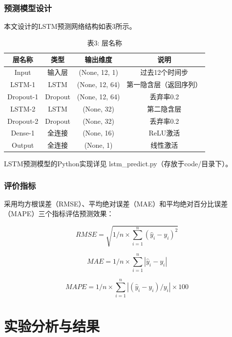 \subsubsection{预测模型设计}

本文设计的LSTM预测网络结构如表3所示。

\begin{table}[H]
  \centering
  \caption{表3: 层名称}
  \label{tab:3}
  \begin{tabular}{cccc}
    \toprule
    层名称 & 类型 & 输出维度 & 说明 \\
    \midrule
    Input & 输入层 & (None, 12, 1) & 过去12个时间步 \\
    LSTM-1 & LSTM & (None, 12, 64) & 第一隐含层（返回序列） \\
    Dropout-1 & Dropout & (None, 12, 64) & 丢弃率0.2 \\
    LSTM-2 & LSTM & (None, 32) & 第二隐含层 \\
    Dropout-2 & Dropout & (None, 32) & 丢弃率0.2 \\
    Dense-1 & 全连接 & (None, 16) & ReLU激活 \\
    Output & 全连接 & (None, 1) & 线性激活 \\
    \bottomrule
  \end{tabular}
\end{table}

LSTM预测模型的Python实现详见 lstm\_predict.py（存放于code/目录下）。

\subsubsection{评价指标}

采用均方根误差（RMSE）、平均绝对误差（MAE）和平均绝对百分比误差（MAPE）三个指标评估预测效果：

\begin{equation}
  RMSE = \sqrt{1/n  \times  \sum_{i=1}^{n}{(\hat{y}_{i} - y_{i})^2}}
  \label{eq:9}
\end{equation}

\begin{equation}
  MAE = 1/n  \times  \sum_{i=1}^{n}{|\hat{y}_{i} - y_{i}|}
  \label{eq:10}
\end{equation}

\begin{equation}
  MAPE = 1/n  \times  \sum_{i=1}^{n}{|(\hat{y}_{i} - y_{i})/y_{i}|}  \times  100%
  \label{eq:11}
\end{equation}

\section{实验分析与结果}

